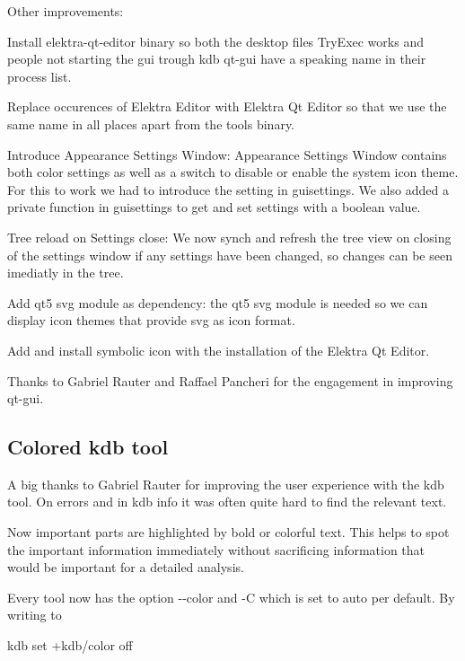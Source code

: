 Other improvements\+:


\begin{DoxyItemize}
\item Install {\ttfamily elektra-\/qt-\/editor} binary so both the desktop files Try\+Exec works and people not starting the gui trough {\ttfamily kdb qt-\/gui} have a speaking name in their process list.
\item Replace occurences of {\ttfamily Elektra Editor} with {\ttfamily Elektra Qt Editor} so that we use the same name in all places apart from the tools binary.
\item Introduce Appearance Settings Window\+: Appearance Settings Window contains both color settings as well as a switch to disable or enable the system icon theme. For this to work we had to introduce the setting in {\ttfamily guisettings}. We also added a private function in {\ttfamily guisettings} to get and set settings with a boolean value.
\item Tree reload on Settings close\+: We now synch and refresh the tree view on closing of the settings window if any settings have been changed, so changes can be seen imediatly in the tree.
\item Add qt5 svg module as dependency\+: the qt5 svg module is needed so we can display icon themes that provide svg as icon format.
\item Add and install symbolic icon with the installation of the Elektra Qt Editor.
\end{DoxyItemize}

Thanks to Gabriel Rauter and Raffael Pancheri for the engagement in improving qt-\/gui.

\subsection*{Colored kdb tool}

A big thanks to Gabriel Rauter for improving the user experience with the kdb tool. On errors and in {\ttfamily kdb info} it was often quite hard to find the relevant text.

Now important parts are highlighted by bold or colorful text. This helps to spot the important information immediately without sacrificing information that would be important for a detailed analysis.

Every tool now has the option {\ttfamily -\/-\/color} and {\ttfamily -\/\+C} which is set to {\ttfamily auto} per default. By writing to \begin{DoxyVerb}kdb set +kdb/color off
\end{DoxyVerb}


